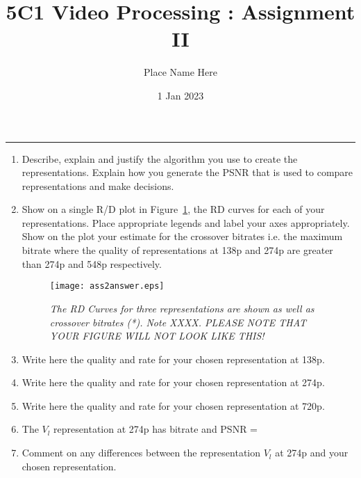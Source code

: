 \documentclass[a4paper]{article}
\title{5C1 Video Processing :  Assignment II}
\author{Place Name Here}
\date{1 Jan 2023}  %
\begin{document}
\maketitle%
\vspace*{1\baselineskip}
\hrule
\large


\begin{enumerate}
    \item Describe, explain and justify the algorithm you use to create the representations. Explain how you generate the PSNR that is used to compare representations and make decisions. \\
    \item Show on a single R/D plot in Figure~\ref{rd}, the RD curves for each of your representations. Place appropriate legends and label your axes appropriately. Show on the plot your estimate for the crossover bitrates i.e. the maximum bitrate where the quality of representations at 138p and 274p are greater than 274p and 548p respectively.
    \begin{figure}     
    \centering
    \texttt{[image: ass2answer.eps]}
    \caption{\em The RD Curves for three representations are shown as well as crossover bitrates (*). Note XXXX. PLEASE NOTE THAT YOUR FIGURE WILL NOT LOOK LIKE THIS! \label{rd}}
\end{figure}
    \item Write here the quality and rate for your chosen representation at 138p.  
    \item Write here the quality and rate for your chosen representation at 274p.  
    \item Write here the quality and rate for your chosen representation at 720p.  
    \item The $V_l$ representation at 274p has bitrate and PSNR = 
    \item Comment on any differences between the  representation $V_l$ at 274p and your chosen representation. \\
    
        
\end{enumerate}
\end{document}
